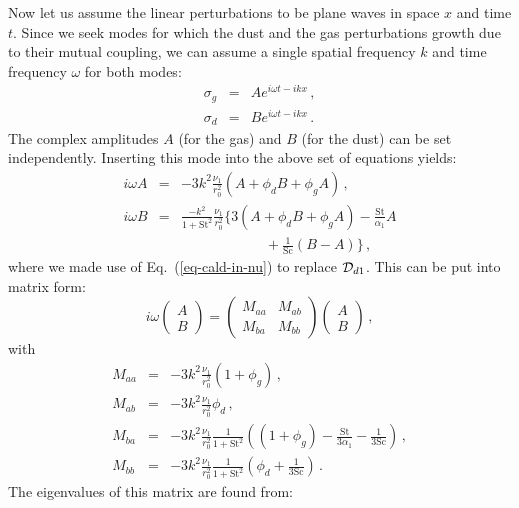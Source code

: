 \documentclass{aa}
\def\comma{\,,}
\def\fullstop{\,.}
\newcommand{\revised}[1]{{#1}}
\begin{document}
Now let us assume the linear perturbations to be plane waves in space $x$ and
time $t$. Since we seek modes for which the dust and the gas perturbations
growth due to their mutual coupling, we can assume a single spatial frequency
$k$ and time frequency $\omega$ for both modes:
\begin{eqnarray}
\sigma_g &=& A e^{i\omega t-ikx}\comma\\
\sigma_d &=& B e^{i\omega t-ikx}\fullstop
\end{eqnarray}
The complex amplitudes $A$ (for the gas) and $B$ (for the dust) can be
set independently. Inserting this mode into the above set of equations yields:
\begin{eqnarray}
  i\omega A
  &=& -3k^2 \frac{\nu_1}{r_0^2}\left(A
  +\phi_d B+\phi_gA\right)\comma\\
  i\omega B &=&
  \frac{-k^2}{1+\mathrm{St}^2}\frac{\nu_1}{r_0^2}\bigg\{
  3\left(A
  +\phi_dB+\phi_gA\right)
  -\frac{\mathrm{St}}{\alpha_1}A
   \nonumber\\
 & & \qquad\qquad\qquad +\frac{1}{\mathrm{Sc}}
  (B-A)\bigg\}\comma
\end{eqnarray}
\revised{where we made use of Eq.~(\ref{eq-cald-in-nu}) to replace ${\cal D}_{d1}$.}
This can be put into matrix form:
\begin{equation}
i\omega \left(\begin{matrix}
  A\\
  B
\end{matrix}\right)
=\left(\begin{matrix}
  M_{aa} & M_{ab}\\
  M_{ba} & M_{bb}
\end{matrix}\right)
\left(\begin{matrix}
  A\\
  B
\end{matrix}\right)\comma
\end{equation}
with
\begin{eqnarray}
  M_{aa} &=& -3k^2\frac{\nu_1}{r_0^2}(1+\phi_g)\comma \\
  M_{ab} &=& -3k^2\frac{\nu_1}{r_0^2}\phi_d\comma \\
  M_{ba} &=& -3k^2\frac{\nu_1}{r_0^2}
  \frac{1}{1+\mathrm{St}^2}\left((1+\phi_g)-\frac{\mathrm{St}}{3\alpha_1}-\frac{1}{3\mathrm{Sc}}\right)\comma\\
  M_{bb} &=& -3k^2\frac{\nu_1}{r_0^2}
  \frac{1}{1+\mathrm{St}^2}\left(\phi_d+\frac{1}{3\mathrm{Sc}}\right)\fullstop
\end{eqnarray}
The eigenvalues of this matrix are found from:
\end{document}
